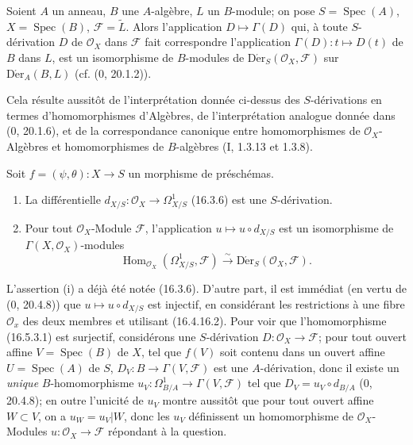 \begin{proposition}[16.5.2]
\label{IV.16.5.2}
Soient $A$ un anneau, $B$ une $A$-algèbre, $L$ un $B$-module; on pose
$S=\operatorname{Spec}(A)$, $X=\operatorname{Spec}(B)$,
$\mathscr{F}=\widetilde{L}$. Alors l'application $D\mapsto\Gamma(D)$ qui, à
toute $S$-dérivation $D$ de $\mathcal{O}_X$ dans $\mathscr{F}$ fait
correspondre l'application $\Gamma(D):t\mapsto D(t)$ de $B$ dans $L$, est un
isomorphisme de $B$-modules de
$\operatorname{D\acute{e}r}_S(\mathcal{O}_X,\mathscr{F})$ sur
$\operatorname{D\acute{e}r}_A(B,L)$ (cf. (0, 20.1.2)).
\end{proposition}

Cela résulte aussitôt de l'interprétation donnée ci-dessus des $S$-dérivations
en termes
d'homomorphismes d'Algèbres, de l'interprétation analogue donnée dans
(0, 20.1.6), et de la correspondance canonique entre homomorphismes de
$\mathcal{O}_X$-Algèbres et homomorphismes de $B$-algèbres (I, 1.3.13 et
1.3.8).

\begin{proposition}[16.5.3]
\label{IV.16.5.3}
Soit $f=(\psi,\theta):X\to S$ un morphisme de préschémas.
\begin{enumerate}
\item[(i)] La différentielle
$d_{X/S}:\mathcal{O}_X\to\Omega_{X/S}^1$ (16.3.6) est une $S$-dérivation.
\item[(ii)] Pour tout $\mathcal{O}_X$-Module $\mathscr{F}$, l'application
$u\mapsto u\circ d_{X/S}$ est un isomorphisme de
$\Gamma(X,\mathcal{O}_X)$-modules
\[
  \operatorname{Hom}_{\mathcal{O}_X}(\Omega_{X/S}^1,\mathscr{F})
  \xrightarrow{\sim}
  \operatorname{D\acute{e}r}_S(\mathcal{O}_X,\mathscr{F}).
  \tag{16.5.3.1}
  \label{IV.16.5.3.1}
\]
\end{enumerate}
\end{proposition}

L'assertion (i) a déjà été notée (16.3.6). D'autre part, il est immédiat (en
vertu de (0, 20.4.8)) que $u\mapsto u\circ d_{X/S}$ est injectif, en
considérant les restrictions à une fibre $\mathcal{O}_x$ des deux membres et
utilisant (16.4.16.2). Pour voir que l'homomorphisme (16.5.3.1) est surjectif,
considérons une $S$-dérivation $D:\mathcal{O}_X\to\mathscr{F}$; pour tout
ouvert affine $V=\operatorname{Spec}(B)$ de $X$, tel que $f(V)$ soit contenu
dans un ouvert affine $U=\operatorname{Spec}(A)$ de $S$,
$D_V:B\to\Gamma(V,\mathscr{F})$ est une $A$-dérivation, donc il existe un
\emph{unique} $B$-homomorphisme
$u_V:\Omega_{B/A}^1\to\Gamma(V,\mathscr{F})$ tel que
$D_V=u_V\circ d_{B/A}$ (0, 20.4.8); en outre l'unicité de $u_V$ montre
aussitôt que pour tout ouvert affine $W\subset V$, on a $u_W=u_V|W$, donc les
$u_V$ définissent un homomorphisme de $\mathcal{O}_X$-Modules
$u:\mathcal{O}_X\to\mathscr{F}$ répondant à la question.

